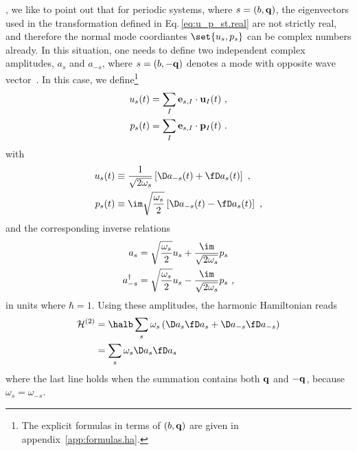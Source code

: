 , we like to point out that for periodic systems, where $s=(b, {\bf q})$, the eigenvectors used in the transformation defined in Eq.\,\eqref{eq:u_p_st.real} are not strictly real, and therefore the normal mode coordiantes $\set{u_s, p_s}$ can be complex numbers already. In this situation, one needs to define two independent complex amplitudes, $a_s$ and $a_{-s}$, where $s = (b, - {\bf q})$ denotes a mode with opposite wave vector~\cite[p.\,300]{BornHuang}. In this case, we define\footnote{The explicit formulas in terms of $(b, {\bf q})$ are given in appendix~\ref{app:formulas.ha}.}
\begin{subequations}
	\label{eq:u_s.periodic}
\begin{align}
u_s (t)
&= \sum_{I} {\bf e}_{s, I} \cdot {\bf u}_{I} (t)~,
\label{eq:u_st)} \\
p_s (t)
&=\sum_{I} {\bf e}_{s, I} \cdot {\bf p}_{I} (t) ~.
\label{eq:p_st.periodic}
\end{align}
\end{subequations}
%
%
with
\begin{subequations}
	\label{eq:u_s.amplitudes.periodic}
	\begin{align}
	u_s (t) 
	&\equiv \frac{1}{\sqrt{2 \omega_{s}}} \left[ \D a_{-s} (t) + \fD a_s (t) \right]~, \\
	p_s (t) 
	&\equiv \im \sqrt{\frac{\omega_s}{2}} \left[ \D a_{-s} (t) - \fD a_s (t) \right]~,
	\end{align}
\end{subequations}
and the corresponding inverse relations
\begin{subequations}
	\label{eq:a(q)}
	\begin{align}
	a_s
	&= \sqrt{\frac{\omega_s}{2}} u_s + \frac{\im}{\sqrt{2 \omega_s}} p_s \\
	a^\dagger_{-s}
	&= \sqrt{\frac{\omega_s}{2}} u_s - \frac{\im}{\sqrt{2 \omega_s}} p_s~,
	\end{align}
\end{subequations}
in units where $\hbar = 1$. Using these amplitudes, the harmonic Hamiltonian reads
\begin{align}
	\mathcal{H}^{(2)}
		&= \halb \sum_s \omega_s \left( \D a_s \fD a_s + \D a_{-s} \fD a_{-s} \right) \\
		&= \sum_s \omega_s \D a_s \fD a_s
\end{align}
where the last line holds when the summation contains both $\bf q$ and $- {\bf q}$, because $\omega_s = \omega_{-s}$.

